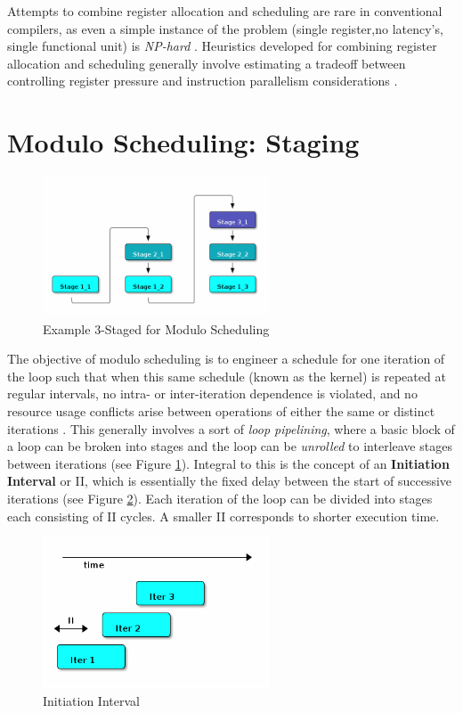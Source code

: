 \documentclass[12pt]{report}
\begin{document}
Attempts to combine register allocation and scheduling are rare in
conventional compilers, as even a simple instance of the problem (single
register,no latency's, single functional unit) is \emph{NP-hard}
\parencite{motwani1995combining} \parencite{Pinter:1993:RAI:173262.155114}.
Heuristics developed for combining register allocation and scheduling
generally involve estimating a tradeoff between controlling register pressure
and instruction parallelism considerations \parencite{motwani1995combining}.

\section{Modulo Scheduling: Staging}
\label{sec:org875c994}
\begin{figure}[htbp]
\centering
\includegraphics[width=0.6\textwidth]{figures/SwingModuloStaging.png}
\caption{\label{fig:SwingStaging}Example 3-Staged for Modulo Scheduling}
\end{figure}

The objective of modulo scheduling is to engineer a schedule for one
iteration of the loop such that when this same schedule (known as the kernel)
is repeated at regular intervals, no intra- or inter-iteration dependence is
violated, and no resource usage conflicts arise between operations of either
the same or distinct iterations \parencite{rau1996iterative}. This generally
involves a sort of \emph{loop pipelining}, where a basic block of a loop can be
broken into stages and the loop can be \emph{unrolled} to interleave stages
between iterations (see Figure \ref{fig:SwingStaging}). Integral to this is the
concept of an \textbf{Initiation Interval} or II, which is essentially the fixed
delay between the start of successive iterations (see Figure
\ref{fig:InitiationInterval}). Each iteration of the loop can be divided into
stages each consisting of II cycles. A smaller II corresponds to shorter
execution time.

\begin{figure}[htbp]
\centering
\includegraphics[width=0.6\textwidth]{figures/InitiationInterval.png}
\caption{\label{fig:InitiationInterval}Initiation Interval}
\end{figure}
\end{document}
